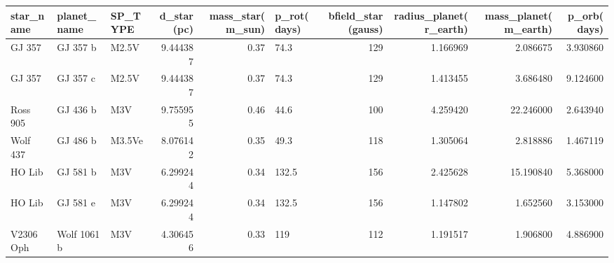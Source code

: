 \begin{tabular}{lllrrlrrrr}
\toprule
             star\_name & planet\_name & SP\_TYPE &  d\_star(pc) &  mass\_star(m\_sun) & p\_rot(days) &  bfield\_star(gauss) &  radius\_planet(r\_earth) &  mass\_planet(m\_earth) &  p\_orb(days) \\
\midrule
               GJ 357  &    GJ 357 b &   M2.5V &    9.444387 &              0.37 &        74.3 &                 129 &                1.166969 &              2.086675 &     3.930860 \\
               GJ 357  &    GJ 357 c &   M2.5V &    9.444387 &              0.37 &        74.3 &                 129 &                1.413455 &              3.686480 &     9.124600 \\
             Ross 905  &    GJ 436 b &     M3V &    9.755955 &              0.46 &        44.6 &                 100 &                4.259420 &             22.246000 &     2.643940 \\
             Wolf 437  &    GJ 486 b &  M3.5Ve &    8.076142 &              0.35 &        49.3 &                 118 &                1.305064 &              2.818886 &     1.467119 \\
               HO Lib  &    GJ 581 b &     M3V &    6.299244 &              0.34 &       132.5 &                 156 &                2.425628 &             15.190840 &     5.368000 \\
               HO Lib  &    GJ 581 e &     M3V &    6.299244 &              0.34 &       132.5 &                 156 &                1.147802 &              1.652560 &     3.153000 \\
            V2306 Oph  & Wolf 1061 b &     M3V &    4.306456 &              0.33 &         119 &                 112 &                1.191517 &              1.906800 &     4.886900 \\
\bottomrule
\end{tabular}
